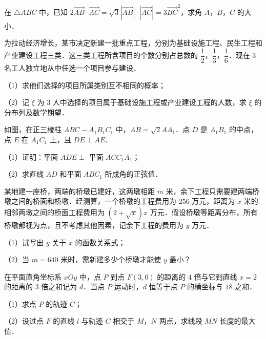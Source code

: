 \begin{question}
在 $\triangle ABC$ 中，已知 $2\overrightarrow{AB}\cdot\overrightarrow{AC}=\sqrt3\left|\overrightarrow{AB}\right|\cdot\left|\overrightarrow{AC}\right|=3\overrightarrow{BC}^2$，求角 $A$，$B$，$C$ 的大小．

\end{question}
\begingroup
\renewenvironment{question}{\Needspace{0.5\textheight}}{}
\begin{question}
为拉动经济增长，某市决定新建一批重点工程，分别为基础设施工程、民生工程和产业建设工程三类．这三类工程所含项目的个数分别占总数的 $\dfrac12$，$\dfrac13$，$\dfrac16$．现在 $3$ 名工人独立地从中任选一个项目参与建设．

（1）求他们选择的项目所属类别互不相同的概率；

（2）记 $\xi$ 为 $3$ 人中选择的项目属于基础设施工程或产业建设工程的人数，求 $\xi$ 的分布列及数学期望．

\Needspace{0.4\textheight}
\end{question}
\endgroup
\begin{question}
如图，在正三棱柱 $ABC-A_1B_1C_1$ 中，$AB=\sqrt2 AA_1$．点 $D$ 是 $A_1B_1$ 的中点，点 $E$ 在 $A_1C_1$ 上，且 $DE\perp AE$．

（1）证明：平面 $ADE\perp$ 平面 $ACC_1A_1$；

（2）求直线 $AD$ 和平面 $ABC_1$ 所成角的正弦值．
\nopagebreak[4]
\begin{center}\end{center}
\nopagebreak[4]
\end{question}
\begin{question}
某地建一座桥，两端的桥墩已建好，这两墩相距 $m$ 米，余下工程只需要建两端桥墩之间的桥面和桥墩．经测算，一个桥墩的工程费用为 $256$ 万元，距离为 $x$ 米的相邻两墩之间的桥面工程费用为 $(2+\sqrt x)x$ 万元．假设桥墩等距离分布，所有桥墩都视为点，且不考虑其他因素，记余下工程的费用为 $y$ 万元．

（1）试写出 $y$ 关于 $x$ 的函数关系式；

（2）当 $m=640$ 米时，需新建多少个桥墩才能使 $y$ 最小？

\end{question}
\begingroup
\renewenvironment{question}{\Needspace{0.5\textheight}}{}
\begin{question}
在平面直角坐标系 $xOy$ 中，点 $P$ 到点 $F(3,0)$ 的距离的 $4$ 倍与它到直线 $x=2$ 的距离的 $3$ 倍之和记为 $d$．当点 $P$ 运动时，$d$ 恒等于点 $P$ 的横坐标与 $18$ 之和．

（1）求点 $P$ 的轨迹 $C$；

（2）设过点 $F$ 的直线 $l$ 与轨迹 $C$ 相交于 $M$，$N$ 两点，求线段 $MN$ 长度的最大值．

\end{question}
